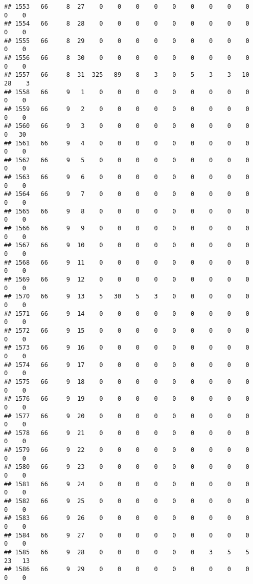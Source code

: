 \documentclass[]{article}
\begin{document}
\begin{verbatim}
## 1553   66     8  27    0    0    0    0    0    0    0    0    0    0    0
## 1554   66     8  28    0    0    0    0    0    0    0    0    0    0    0
## 1555   66     8  29    0    0    0    0    0    0    0    0    0    0    0
## 1556   66     8  30    0    0    0    0    0    0    0    0    0    0    0
## 1557   66     8  31  325   89    8    3    0    5    3    3   10   28    3
## 1558   66     9   1    0    0    0    0    0    0    0    0    0    0    0
## 1559   66     9   2    0    0    0    0    0    0    0    0    0    0    0
## 1560   66     9   3    0    0    0    0    0    0    0    0    0    0   30
## 1561   66     9   4    0    0    0    0    0    0    0    0    0    0    0
## 1562   66     9   5    0    0    0    0    0    0    0    0    0    0    0
## 1563   66     9   6    0    0    0    0    0    0    0    0    0    0    0
## 1564   66     9   7    0    0    0    0    0    0    0    0    0    0    0
## 1565   66     9   8    0    0    0    0    0    0    0    0    0    0    0
## 1566   66     9   9    0    0    0    0    0    0    0    0    0    0    0
## 1567   66     9  10    0    0    0    0    0    0    0    0    0    0    0
## 1568   66     9  11    0    0    0    0    0    0    0    0    0    0    0
## 1569   66     9  12    0    0    0    0    0    0    0    0    0    0    0
## 1570   66     9  13    5   30    5    3    0    0    0    0    0    0    0
## 1571   66     9  14    0    0    0    0    0    0    0    0    0    0    0
## 1572   66     9  15    0    0    0    0    0    0    0    0    0    0    0
## 1573   66     9  16    0    0    0    0    0    0    0    0    0    0    0
## 1574   66     9  17    0    0    0    0    0    0    0    0    0    0    0
## 1575   66     9  18    0    0    0    0    0    0    0    0    0    0    0
## 1576   66     9  19    0    0    0    0    0    0    0    0    0    0    0
## 1577   66     9  20    0    0    0    0    0    0    0    0    0    0    0
## 1578   66     9  21    0    0    0    0    0    0    0    0    0    0    0
## 1579   66     9  22    0    0    0    0    0    0    0    0    0    0    0
## 1580   66     9  23    0    0    0    0    0    0    0    0    0    0    0
## 1581   66     9  24    0    0    0    0    0    0    0    0    0    0    0
## 1582   66     9  25    0    0    0    0    0    0    0    0    0    0    0
## 1583   66     9  26    0    0    0    0    0    0    0    0    0    0    0
## 1584   66     9  27    0    0    0    0    0    0    0    0    0    0    0
## 1585   66     9  28    0    0    0    0    0    0    3    5    5   23   13
## 1586   66     9  29    0    0    0    0    0    0    0    0    0    0    0

\end{verbatim}
\end{document}
